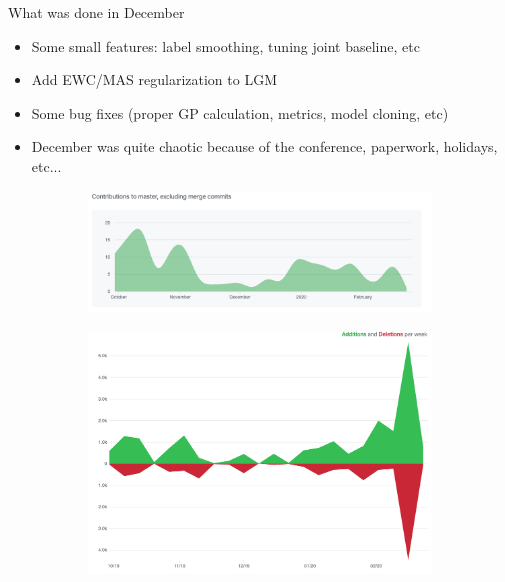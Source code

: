 \documentclass[10pt]{beamer}
\begin{document}
\begin{frame}{What was done in December}
    \begin{itemize}
        \item\pause Some small features: label smoothing, tuning joint baseline, etc
        \item\pause Add EWC/MAS regularization to LGM
        \item\pause Some bug fixes (proper GP calculation, metrics, model cloning, etc)
        \item\pause December was quite chaotic because of the conference, paperwork, holidays, etc...
    \end{itemize}
    
    \pause
    \begin{figure}
    \begin{subfigure}{.45\textwidth}
        \centering
        \includegraphics[width=\textwidth]{images/commits.png}
    \end{subfigure}
    \begin{subfigure}{.45\textwidth}
        \centering
        \includegraphics[width=\textwidth]{images/code-changes.png}
    \end{subfigure}
    \end{figure}
\end{frame}
\end{document}
